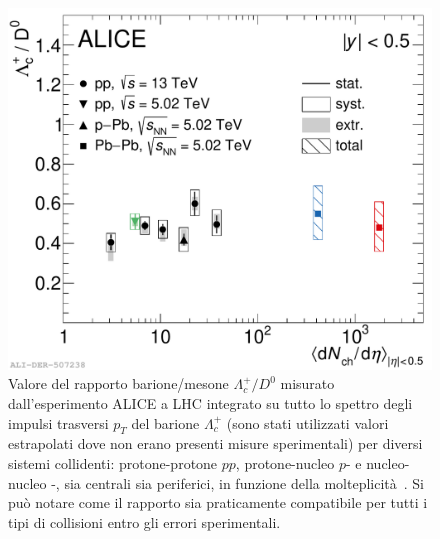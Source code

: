         \begin{figure}[t]
            \centering
            \includegraphics[width=0.83\linewidth]{res/fig/1-chapter/8-ALICE-pp13TeV-pp5.02TeV-pPb5.02TeV-PbPb5.02TeV.pdf}
            \caption{Valore del rapporto barione/mesone $\Lambda_{c}^{+}/D^{0}$ misurato dall'esperimento ALICE a LHC integrato su tutto lo spettro degli impulsi trasversi $p_{T}$ del barione $\Lambda_{c}^{+}$ (sono stati utilizzati valori estrapolati dove non erano presenti misure sperimentali) per diversi sistemi collidenti: protone-protone $pp$, protone-nucleo $p$- e nucleo-nucleo -, sia centrali sia periferici, in funzione della molteplicità~\cite{Kalteyer_ALICE_2022}. Si può notare come il rapporto sia praticamente compatibile per tutti i tipi di collisioni entro gli errori sperimentali.}
            \label{fig:8-ALICE-pp13TeV-pp5.02TeV-pPb5.02TeV-PbPb5.02TeV}
        \end{figure}

